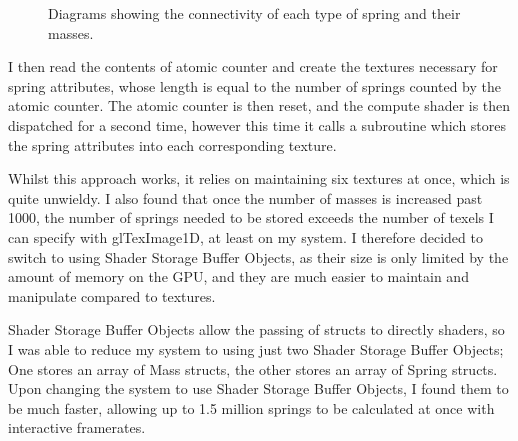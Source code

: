 \documentclass[]{acmsiggraph}
\begin{document}
\begin{figure}[t]
\centering
{}
\caption{Diagrams showing the connectivity of each type of spring and their masses. \protect\cite{siggraphPixar}}
\label{fig:springs}
\end{figure}

I then read the contents of atomic counter and create the textures necessary for spring attributes, whose length is equal to the number of springs counted by the atomic counter. The atomic counter is then reset, and the compute shader is then dispatched for a second time, however this time it calls a subroutine which stores the spring attributes into each corresponding texture.

Whilst this approach works, it relies on maintaining six textures at once, which is quite unwieldy. I also found that once the number of masses is increased past 1000, the number of springs needed to be stored exceeds the number of texels I can specify with glTexImage1D, at least on my system. I therefore decided to switch to using Shader Storage Buffer Objects, as their size is only limited by the amount of memory on the GPU, and they are much easier to maintain and manipulate compared to textures.

Shader Storage Buffer Objects allow the passing of structs to directly shaders, so I was able to reduce my system to using just two Shader Storage Buffer Objects; One stores an array of Mass structs, the other stores an array of Spring structs. Upon changing the system to use Shader Storage Buffer Objects, I found them to be much faster, allowing up to 1.5 million springs to be calculated at once with interactive framerates.
\end{document}
